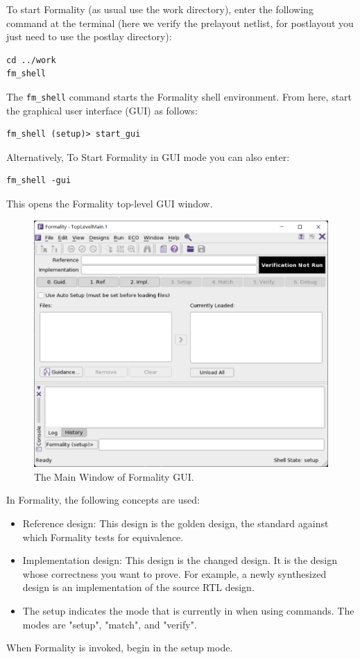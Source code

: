 \documentclass[a4paper,12pt,twoside]{article}
\begin{document}
To start Formality (as usual use the work directory), enter the following command at the terminal (here we verify the prelayout netlist, for postlayout you just need to use the postlay directory):
\begin{verbatim}
cd ../work
fm_shell
\end{verbatim}
The \texttt{fm\_shell} command starts the Formality shell environment. From here, start the graphical user interface (GUI) as follows:
\begin{verbatim}
fm_shell (setup)> start_gui
\end{verbatim}
Alternatively, To Start Formality in GUI mode you can also enter:
\begin{verbatim}
fm_shell -gui
\end{verbatim}
This opens the Formality top-level GUI window.
\begin{figure}[H]
    \centering
    \includegraphics[width=\textwidth]{images/40.png}
    \caption{The Main Window of Formality GUI.}
\end{figure}
In Formality, the following concepts are used:
\begin{itemize}
    \item Reference design: This design is the golden design, the standard against which Formality tests for equivalence.
    \item Implementation design: This design is the changed design. It is the design whose correctness you want to prove. For example, a newly synthesized design is an implementation of the source RTL design.
    \item The setup indicates the mode that is currently in when using commands. The modes are "setup", "match", and "verify".
\end{itemize}
When Formality is invoked, begin in the setup mode.
\end{document}
